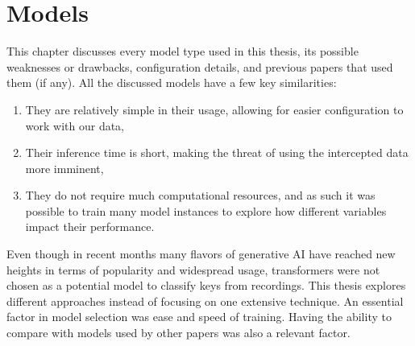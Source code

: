 \documentclass[../main.tex]{subfiles}
\begin{document}
\chapter{Models}
\label{cha:models}


\label{sec:models_intro}
This chapter discusses every model type used in this thesis, its possible weaknesses or drawbacks, configuration details, and previous papers that used them (if any). All the discussed models have a few key similarities: 
\begin{enumerate}
    \item They are relatively simple in their usage, allowing for easier configuration to work with our data,
    \item Their inference time is short, making the threat of using the intercepted data more imminent,
    \item They do not require much computational resources, and as such it was possible to train many model instances to explore how different variables impact their performance.
\end{enumerate}

Even though in recent months many flavors of generative AI have reached new heights in terms of popularity and widespread usage, transformers were not chosen as a potential model to classify keys from recordings. This thesis explores different approaches instead of focusing on one extensive technique. An essential factor in model selection was ease and speed of training. Having the ability to compare with models used by other papers was also a relevant factor.
\end{document}
